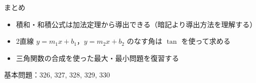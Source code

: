 \documentclass[aspectratio=43,professionalfonts,handout]{beamer}
\begin{document}
\begin{frame}{まとめ}
  \begin{itemize}
    \item 積和・和積公式は加法定理から導出できる（暗記より導出方法を理解する）
    \item 2直線 $y = m_1 x + b_1$，$y = m_2 x + b_2$ のなす角は $\tan$ を使って求める
    \item 三角関数の合成を使った最大・最小問題を復習する
  \end{itemize}

  \vfill
  {\small 基本問題：326, 327, 328, 329, 330}
\end{frame}
\end{document}
